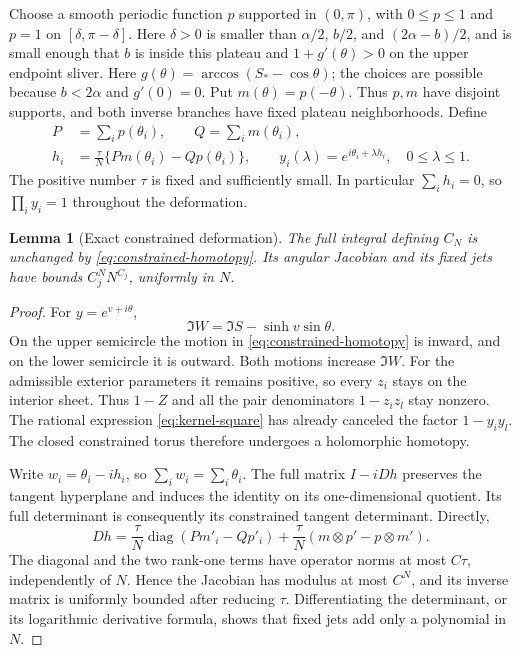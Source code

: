 \documentclass[11pt]{article}
\numberwithin{equation}{section}
\newtheorem{lemma}[theorem]{Lemma}
\theoremstyle{remark}\newtheorem{remark}[theorem]{Remark}
\begin{document}
Choose a smooth periodic function $p$ supported in $(0,\pi)$,
with $0\le p\le1$ and $p=1$ on $[\delta,\pi-\delta]$.
Here $\delta>0$ is smaller than $\alpha/2$, $b/2$, and
$(2\alpha-b)/2$, and is small enough that $b$ is inside this
plateau and $1+g'(\theta)>0$ on the upper endpoint sliver.
Here $g(\theta)=\arccos(S_*-\cos\theta)$; the choices are
possible because $b<2\alpha$ and $g'(0)=0$.  Put $m(\theta)=p(-\theta)$.  Thus $p,m$ have
disjoint supports, and both inverse branches have fixed plateau
neighborhoods.  Define
\begin{equation}\label{eq:constrained-homotopy}
 \begin{aligned}
 P&=\sum_i p(\theta_i),\qquad Q=\sum_i m(\theta_i),\\
 h_i&=\frac\tau N\{P m(\theta_i)-Q p(\theta_i)\},\qquad
 y_i(\lambda)=e^{i\theta_i+\lambda h_i},\quad 0\le\lambda\le1.
 \end{aligned}
\end{equation}
The positive number $\tau$ is fixed and sufficiently small.  In
particular $\sum_i h_i=0$, so $\prod_i y_i=1$ throughout the
deformation.

\begin{lemma}[Exact constrained deformation]
\label{lem:constrained-homotopy}
The full integral defining $C_N$ is unchanged by
\eqref{eq:constrained-homotopy}.  Its angular Jacobian and its fixed
jets have bounds $C_j^N N^{C_j}$, uniformly in $N$.
\end{lemma}
\begin{proof}
For $y=e^{v+i\theta}$,
\[
 \Im W=\Im S-\sinh v\sin\theta.
\]
On the upper semicircle the motion in
\eqref{eq:constrained-homotopy} is inward, and on the lower
semicircle it is outward.  Both motions increase $\Im W$.
For the admissible exterior parameters it remains positive, so every
$z_i$ stays on the interior sheet.  Thus $1-Z$ and all the pair
denominators $1-z_i z_l$ stay nonzero. The rational expression
\eqref{eq:kernel-square} has already canceled the factor $1-y_i y_l$.
The closed constrained torus therefore undergoes a holomorphic
homotopy.

Write $w_i=\theta_i-i h_i$, so $\sum_iw_i=\sum_i\theta_i$.
The full matrix $I-iDh$ preserves the tangent hyperplane and induces
the identity on its one-dimensional quotient.  Its full determinant
is consequently its constrained tangent determinant.  Directly,
\[
 Dh=\frac\tau N\operatorname{diag}(P m'_i-Qp'_i)
       +\frac\tau N(m\otimes p'-p\otimes m').
\]
The diagonal and the two rank-one terms have operator norms at most
$C\tau$, independently of $N$.  Hence the Jacobian has modulus at
most $C^N$, and its inverse matrix is uniformly bounded after reducing
$\tau$.  Differentiating the determinant, or its logarithmic derivative
formula, shows that fixed jets add only a polynomial in $N$.
\end{proof}
\end{document}
